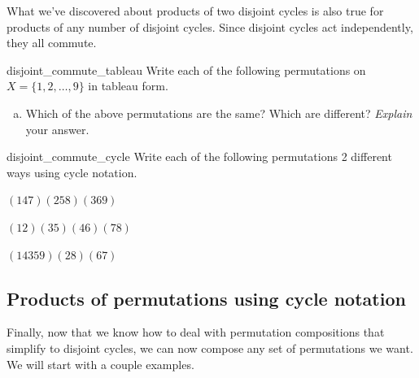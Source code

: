 \noindent
What we've discovered about products of two disjoint cycles is also true for products of any number of disjoint cycles. Since disjoint cycles act independently, they all commute.

\begin{exercise}{disjoint_commute_tableau}
Write each of the following permutations on $X = \{1,2,\ldots,9\}$ in tableau form.
\begin{enumerate}[(a)]
\item
Which of the above permutations are the same? Which are different? \emph{Explain} your answer.
\end{enumerate}
\end{exercise}

\begin{exercise}{disjoint_commute_cycle}
Write each of the following permutations 2 different ways using cycle notation.
\begin{enumerate}[(a)]
\begin{multicols}{3}
\item
$(147)(258)(369)$
\item
$(12)(35)(46)(78)$
\item
$(14359)(28)(67)$
\end{multicols}
\end{enumerate}
\end{exercise}


\subsection{Products of permutations using cycle notation}
\label{subsec:Permutations:CycleNotation:ProductsCycleNotation}

Finally, now that we know how to deal with permutation compositions that simplify to disjoint cycles, we can now compose any set of permutations we want.  We will start with a couple examples.

